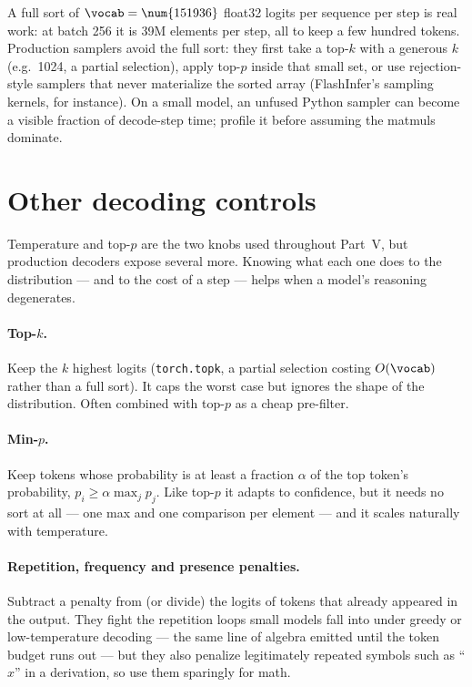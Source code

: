 \begin{systemslens}
A full sort of $\vocab = \num{151936}$ float32 logits per sequence per step is real work: at batch
256 it is 39M elements per step, all to keep a few hundred tokens. Production samplers avoid the
full sort: they first take a top-$k$ with a generous $k$ (e.g.\ 1024, a partial selection), apply
top-$p$ inside that small set, or use rejection-style samplers that never materialize the sorted
array (FlashInfer's sampling kernels, for instance). On a small model, an unfused Python sampler
can become a visible fraction of decode-step time; profile it before assuming the matmuls dominate.
\end{systemslens}


\section{Other decoding controls}\label{sec:scaling:otherdecoding}

Temperature and top-$p$ are the two knobs used throughout Part~V, but production decoders expose
several more. Knowing what each one does to the distribution --- and to the cost of a step --- helps
when a model's reasoning degenerates.

\paragraph{Top-$k$.} Keep the $k$ highest logits (\texttt{torch.topk}, a partial selection costing
$O(\vocab)$ rather than a full sort). It caps the worst case but ignores the shape of the
distribution. Often combined with top-$p$ as a cheap pre-filter.

\paragraph{Min-$p$.} Keep tokens whose probability is at least a fraction $\alpha$ of the top token's
probability, $p_i \ge \alpha \max_j p_j$. Like top-$p$ it adapts to confidence, but it needs no sort
at all --- one max and one comparison per element --- and it scales naturally with temperature.

\paragraph{Repetition, frequency and presence penalties.} Subtract a penalty from (or divide) the
logits of tokens that already appeared in the output. They fight the repetition loops small models
fall into under greedy or low-temperature decoding --- the same line of algebra emitted until the
token budget runs out --- but they also penalize legitimately repeated symbols such as
``$x$'' in a derivation, so use them sparingly for math.


